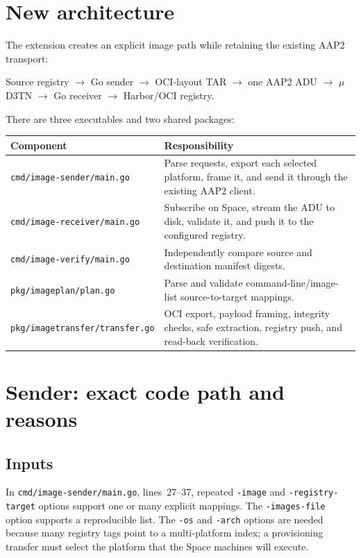 \documentclass[11pt,a4paper]{article}
\newcommand{\file}[1]{\texttt{#1}}
\newcommand{\lines}[1]{lines~#1}
\begin{document}
\section{New architecture}
The extension creates an explicit image path while retaining the existing AAP2
transport:

\begin{center}
Source registry $\rightarrow$ Go sender $\rightarrow$ OCI-layout TAR
$\rightarrow$ one AAP2 ADU $\rightarrow$ \(\mu\)D3TN
$\rightarrow$ Go receiver $\rightarrow$ Harbor/OCI registry.
\end{center}

There are three executables and two shared packages:
\begin{longtable}{p{}p{}}
\toprule
Component & Responsibility\\ \midrule
\file{cmd/image-sender/main.go} & Parse requests, export each selected platform,
frame it, and send it through the existing AAP2 client.\\
\file{cmd/image-receiver/main.go} & Subscribe on Space, stream the ADU to disk,
validate it, and push it to the configured registry.\\
\file{cmd/image-verify/main.go} & Independently compare source and destination
manifest digests.\\
\file{pkg/imageplan/plan.go} & Parse and validate command-line/image-list
source-to-target mappings.\\
\file{pkg/imagetransfer/transfer.go} & OCI export, payload framing, integrity
checks, safe extraction, registry push, and read-back verification.\\
\bottomrule
\end{longtable}

\section{Sender: exact code path and reasons}
\subsection{Inputs}
In \file{cmd/image-sender/main.go}, \lines{27--37}, repeated \file{-image} and
\file{-registry-target} options support one or many explicit mappings. The
\file{-images-file} option supports a reproducible list. The \file{-os} and
\file{-arch} options are needed because many registry tags point to a
multi-platform index; a provisioning transfer must select the platform that
the Space machines will execute.
\end{document}
